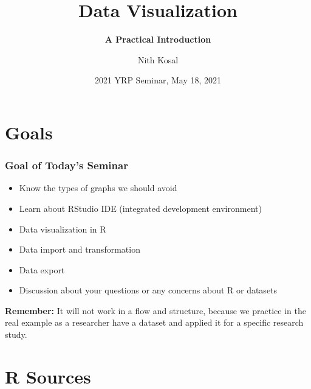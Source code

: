 \documentclass[11pt]{beamer}
\begin{document}
	\author[Nith Kosal]{Nith Kosal}
	\title[Presentation Title]{\bfseries Data Visualization}
	\subtitle{\bfseries A Practical Introduction}

	
	\date[\today]{2021 YRP Seminar, May 18, 2021}

	\begin{frame}[plain]
		\maketitle
		
	\end{frame}
	\setcounter{framenumber}{0}
\section{Goals}
	\begin{frame}

	\frametitle{\bfseries Goal of Today's Seminar}
	
	\begin{itemize}
		\item Know the types of graphs we should avoid 
		\item Learn about RStudio IDE (integrated development environment) 
		\item Data visualization in R
		\item Data import and transformation
		\item Data export 
		\item Discussion about your questions or any concerns about R or datasets   
	\end{itemize}

\textbf{Remember:} It will not work in a flow and structure, because we practice in the real example as a researcher have a dataset and applied it for a specific research study.
\end{frame}
\section{R Sources}
	
\end{document}
